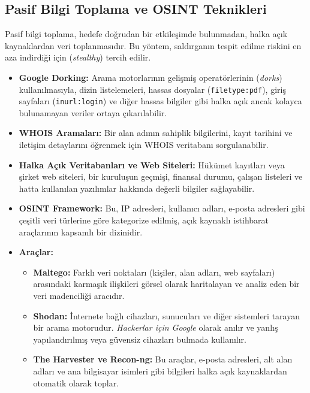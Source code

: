 \subsection{Pasif Bilgi Toplama ve OSINT Teknikleri}

Pasif bilgi toplama, hedefe doğrudan bir etkileşimde bulunmadan, halka açık kaynaklardan veri toplanmasıdır. Bu yöntem, saldırganın tespit edilme riskini en aza indirdiği için (\textit{stealthy}) tercih edilir.

\begin{itemize}
\item \textbf{Google Dorking:} Arama motorlarının gelişmiş operatörlerinin (\textit{dorks}) kullanılmasıyla, dizin listelemeleri, hassas dosyalar (\texttt{filetype:pdf}), giriş sayfaları (\texttt{inurl:login}) ve diğer hassas bilgiler gibi halka açık ancak kolayca bulunamayan veriler ortaya çıkarılabilir.
\item \textbf{WHOIS Aramaları:} Bir alan adının sahiplik bilgilerini, kayıt tarihini ve iletişim detaylarını öğrenmek için WHOIS veritabanı sorgulanabilir.
\item \textbf{Halka Açık Veritabanları ve Web Siteleri:} Hükümet kayıtları veya şirket web siteleri, bir kuruluşun geçmişi, finansal durumu, çalışan listeleri ve hatta kullanılan yazılımlar hakkında değerli bilgiler sağlayabilir.
\item \textbf{OSINT Framework:} Bu, IP adresleri, kullanıcı adları, e-posta adresleri gibi çeşitli veri türlerine göre kategorize edilmiş, açık kaynaklı istihbarat araçlarının kapsamlı bir dizinidir.
\item \textbf{Araçlar:}
\begin{itemize}
\item \textbf{Maltego:} Farklı veri noktaları (kişiler, alan adları, web sayfaları) arasındaki karmaşık ilişkileri görsel olarak haritalayan ve analiz eden bir veri madenciliği aracıdır.
\item \textbf{Shodan:} İnternete bağlı cihazları, sunucuları ve diğer sistemleri tarayan bir arama motorudur. \textit{Hackerlar için Google} olarak anılır ve yanlış yapılandırılmış veya güvensiz cihazları bulmada kullanılır.
\item \textbf{The Harvester ve Recon-ng:} Bu araçlar, e-posta adresleri, alt alan adları ve ana bilgisayar isimleri gibi bilgileri halka açık kaynaklardan otomatik olarak toplar.
\end{itemize}
\end{itemize}
